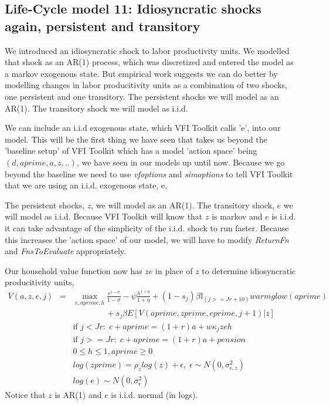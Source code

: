 
\subsection{Life-Cycle model 11: Idiosyncratic shocks again, persistent and transitory}
We introduced an idiosyncratic shock to labor productivity units. We modelled that shock as an AR(1) process, which was discretized and entered the model as a markov exogenous state. But empirical work suggests we can do better by modelling changes in labor producitivity units as a combination of two shocks, one persistent and one transitory. The persistent shocks we will model as an AR(1). The transitory shock we will model as i.i.d.

We can include an i.i.d exogenous state, which VFI Toolkit calls 'e', into our model. This will be the first thing we have seen that takes us beyond the 'baseline setup' of VFI Toolkit which has a model 'action space' being $(d,aprime,a,z,..)$, we have seen in our models up until now. Because we go beyond the baseline we need to use \textit{vfoptions} and \textit{simoptions} to tell VFI Toolkit that we are using an i.i.d. exogenous state, e.

The persistent shocks, $z$, we will model as an AR(1). The transitory shock, $e$ we will model as i.i.d. Because VFI Toolkit will know that $z$ is markov and $e$ is i.i.d. it can take advantage of the simplicity of the i.i.d. shock to run faster. Because this increases the 'action space' of our model, we will have to modify \textit{ReturnFn} and \textit{FnsToEvaluate} appropriately.

Our household value function now has $z e$ in place of $z$ to determine idiosyncratic producitivity units,
\begin{eqnarray*}
 V(a,z,e,j)&=& \max_{c,aprime,h} \frac{c^{1-\sigma}}{1-\sigma} - \psi \frac{h^{1+\eta}}{1+\eta} + (1-s_j)\beta  \mathbb{I}_{(j>=Jr+10)} warmglow(aprime)  \\
 && \quad \quad \quad \quad+ s_j \beta E[V(aprime,zprime,eprime,j+1)|z] \\
&& \text{if }j<Jr: \; c+aprime=(1+r)a+w \kappa_j  z e h \\
&& \text{if }j>=Jr: \; c+aprime=(1+r)a +pension\\
&& 0\leq h \leq 1, aprime\geq 0 \\
&& log(zprime)=\rho_{z} log(z) + \epsilon, \; \epsilon \sim N(0,\sigma_{\epsilon,z}^2) \\
&& log(e) \sim N(0,\sigma_{e}^2)
\end{eqnarray*}
Notice that $z$ is AR(1) and $e$ is i.i.d. normal (in logs).

